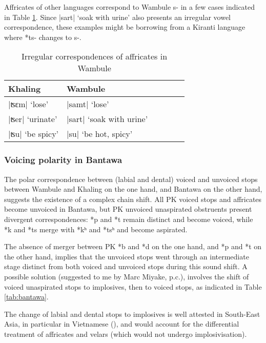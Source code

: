 \documentclass[oneside,a4paper,11pt]{article}
\newcommand{\ipa}[1]{{\phon\mbox{#1}}} %
\newcommand{\dhatu}[2]{|\ipa{#1}| `#2'}
\begin{document}
Affricates of other languages correspond to Wambule \ipa{s-} in a few cases indicated in Table \ref{tab:affricates.wambule}. Since \dhatu{sart}{soak with urine} also presents an irregular vowel correspondence, these examples might  be borrowing from a Kiranti language where *\ipa{ts-} changes to \ipa{s-}.

\begin{table}[H]
\caption{Irregular correspondences of affricates in Wambule} \centering \label{tab:affricates.wambule}
\begin{tabular}{llllll}
\toprule
Khaling & Wambule \\
\midrule
\dhatu{ʦɛm}{lose} & \dhatu{samt}{lose}\\
\dhatu{ʦer}{urinate} & \dhatu{sart}{soak with urine} \\
\dhatu{ʦu}{be spicy} & \dhatu{su}{be hot, spicy}\\
\bottomrule
\end{tabular}
\end{table}

\subsubsection{Voicing polarity in Bantawa} \label{sec:polarity}
The polar correspondence between (labial and dental) voiced and unvoiced stops between Wambule and Khaling on the one hand, and Bantawa on the other hand, suggests the existence of a complex chain shift. All PK voiced stops and affricates become unvoiced in Bantawa, but PK unvoiced unaspirated obstruents  present divergent correspondences: *\ipa{p} and *\ipa{t} remain distinct and become voiced, while *\ipa{k} and *\ipa{ts} merge with *\ipa{kʰ} and *\ipa{tsʰ} and become aspirated.

The absence of merger between PK *\ipa{b} and *\ipa{d} on the one hand, and *\ipa{p} and *\ipa{t} on the other hand, implies that the unvoiced stops went through an intermediate stage distinct from both voiced and unvoiced stops during this sound shift. A possible solution (suggested to me by Marc Miyake, p.c.), involves the shift of voiced unaspirated stops to implosives, then to voiced stops, as indicated in Table \ref{tab:bantawa}.

The change of labial and dental stops to implosives is well attested in South-East Asia, in particular in Vietnamese (\citealt{ferlus82spirantisation}), and would account for the differential treatment of affricates and velars (which would not undergo implosivisation). 
\end{document}
